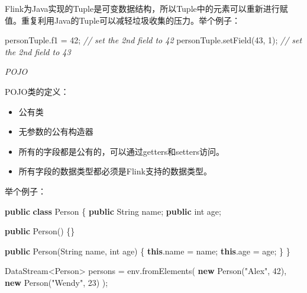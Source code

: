 \documentclass[cn,11pt,chinese]{elegantbook}
\newenvironment{Shaded}{}{}
\newcommand{\BuiltInTok}[1]{#1}
\newcommand{\CommentTok}[1]{\textcolor[rgb]{0.38,0.63,0.69}{\textit{#1}}}
\newcommand{\DataTypeTok}[1]{\textcolor[rgb]{0.56,0.13,0.00}{#1}}
\newcommand{\DecValTok}[1]{\textcolor[rgb]{0.25,0.63,0.44}{#1}}
\newcommand{\FunctionTok}[1]{\textcolor[rgb]{0.02,0.16,0.49}{#1}}
\newcommand{\KeywordTok}[1]{\textcolor[rgb]{0.00,0.44,0.13}{\textbf{#1}}}
\newcommand{\NormalTok}[1]{#1}
\newcommand{\StringTok}[1]{\textcolor[rgb]{0.25,0.44,0.63}{#1}}
\providecommand{\tightlist}{%
  \setlength{\itemsep}{0pt}\setlength{\parskip}{0pt}}
\begin{document}
Flink为Java实现的Tuple是可变数据结构，所以Tuple中的元素可以重新进行赋值。重复利用Java的Tuple可以减轻垃圾收集的压力。举个例子：

\begin{Shaded}
\begin{Highlighting}[]
\NormalTok{personTuple.}\FunctionTok{f1}\NormalTok{ = }\DecValTok{42}\NormalTok{; }\CommentTok{// set the 2nd field to 42}
\NormalTok{personTuple.}\FunctionTok{setField}\NormalTok{(}\DecValTok{43}\NormalTok{, }\DecValTok{1}\NormalTok{); }\CommentTok{// set the 2nd field to 43}
\end{Highlighting}
\end{Shaded}

\emph{POJO}

POJO类的定义：

\begin{itemize}
\tightlist
\item
  公有类
\item
  无参数的公有构造器
\item
  所有的字段都是公有的，可以通过getters和setters访问。
\item
  所有字段的数据类型都必须是Flink支持的数据类型。
\end{itemize}

举个例子：

\begin{Shaded}
\begin{Highlighting}[]
\KeywordTok{public} \KeywordTok{class}\NormalTok{ Person \{}
  \KeywordTok{public} \BuiltInTok{String}\NormalTok{ name;}
  \KeywordTok{public} \DataTypeTok{int}\NormalTok{ age;}

  \KeywordTok{public} \FunctionTok{Person}\NormalTok{() \{\}}

  \KeywordTok{public} \FunctionTok{Person}\NormalTok{(}\BuiltInTok{String}\NormalTok{ name, }\DataTypeTok{int}\NormalTok{ age) \{}
    \KeywordTok{this}\NormalTok{.}\FunctionTok{name}\NormalTok{ = name;}
    \KeywordTok{this}\NormalTok{.}\FunctionTok{age}\NormalTok{ = age;}
\NormalTok{  \}}
\NormalTok{\}}

\NormalTok{DataStream\textless{}Person\textgreater{} persons = env.}\FunctionTok{fromElements}\NormalTok{(}
  \KeywordTok{new} \FunctionTok{Person}\NormalTok{(}\StringTok{"Alex"}\NormalTok{, }\DecValTok{42}\NormalTok{),}
  \KeywordTok{new} \FunctionTok{Person}\NormalTok{(}\StringTok{"Wendy"}\NormalTok{, }\DecValTok{23}\NormalTok{)}
\NormalTok{);}
\end{Highlighting}
\end{Shaded}
\end{document}
